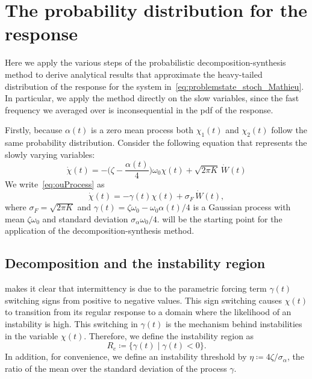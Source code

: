 \documentclass[3p]{elsarticle}
\begin{document}
\section{The probability distribution for the response}\label{sec:analysis}

Here we  apply the various steps of the probabilistic decomposition-synthesis method to derive analytical results that approximate the heavy-tailed distribution of the response for the system in~\cref{eq:problemstate_stoch_Mathieu}. In particular, we apply the method directly on the slow variables, since the fast frequency we averaged over  is  inconsequential in the    pdf of the response.

Firstly, because $\alpha(t)$ is a zero mean process both $\chi_1(t)$ and $\chi_2(t)$  follow the same  probability distribution.  Consider the following  equation that represents the slowly varying variables: 
\begin{equation}\label{eq:ouProcess}
\dot \chi(t) = -\biggl( \zeta   -\frac{ \alpha(t)}{4} \biggr)\omega_0  \chi(t)   + \sqrt{2 \pi K }  \, \dot W(t)
\end{equation}
We write~\cref{eq:ouProcess} as
\begin{equation}\label{eq:ouProcessCanonical}
\dot \chi(t) = - \gamma(t)  \chi (t)  +  \sigma_F \, \dot W(t),
\end{equation}
where $\sigma_F = \sqrt{2 \pi K } $ and $\gamma(t) =  \zeta \omega_0 -     \omega_0    \alpha(t)/ 4$ is a Gaussian process with mean $   \zeta \omega_0$ and standard deviation $ \sigma_\alpha \omega_0  / 4 $.  will be  the starting point  for   the application of the decomposition-synthesis method.


\subsection{Decomposition and  the instability region}

  makes it clear  that intermittency is due to the parametric forcing term $\gamma(t)$ switching signs from positive to negative values. This sign switching causes $\chi(t)$ 
to transition from its regular response to a domain  where the likelihood of an instability is high. This   switching in $\gamma(t)$ is the   mechanism behind instabilities in the variable $\chi(t)$. Therefore, we define the instability region as
\begin{equation}
R_e \coloneqq \{ \gamma(t) \mid \gamma(t)  < 0\}.
\end{equation}
In addition, for convenience, we  define an instability  threshold  by   $\eta \coloneqq   4\zeta /   \sigma_{\alpha}$, the ratio of the mean over the standard deviation of the process $\gamma$. 
\end{document}
